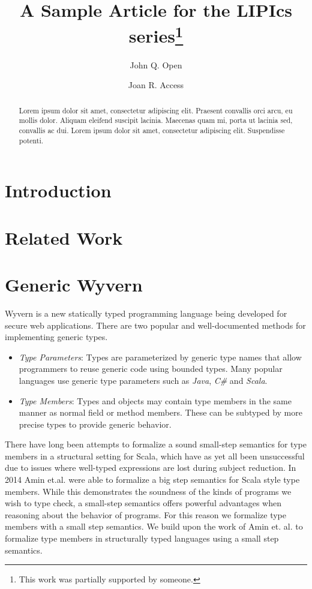 \documentclass[a4paper,UKenglish]{lipics}
\title{A Sample Article for the LIPIcs series\footnote{This work was partially supported by someone.}}
\author[1]{John Q. Open}
\author[2]{Joan R. Access}
\affil[1]{Dummy University Computing Laboratory\\
  Address, Country\\
  \texttt{open@dummyuni.org}}
\affil[2]{Department of Informatics, Dummy College\\
  Address, Country\\
  \texttt{access@dummycollege.org}}
\begin{document}
\maketitle

\begin{abstract}
Lorem ipsum dolor sit amet, consectetur adipiscing elit. Praesent convallis orci arcu, eu mollis dolor. Aliquam eleifend suscipit lacinia. Maecenas quam mi, porta ut lacinia sed, convallis ac dui. Lorem ipsum dolor sit amet, consectetur adipiscing elit. Suspendisse potenti. 
 \end{abstract}
 
\section{Introduction}

\section{Related Work}


\section{Generic Wyvern}
Wyvern is a new statically typed programming language being developed for secure web applications. There are two popular and well-documented methods \cite{Virtual Types stuff, generic java etc} for implementing generic types.
\begin{itemize}
\item \emph{Type Parameters}: Types are parameterized by generic type names that allow programmers to reuse generic code using bounded types. Many popular languages use generic type parameters such as \emph{Java}, \emph{C\#} and \emph{Scala}.
\item \emph{Type Members}: Types and objects may contain type members in the same manner as normal field or method members. These can be subtyped by more precise types to provide generic behavior.
\end{itemize}
There have long been attempts to formalize a sound small-step semantics for type members in a structural setting for Scala, which have as yet all been unsuccessful due to issues where well-typed expressions are lost during subject reduction. In 2014 Amin et.al. were able to formalize a big step semantics for Scala style type members. While this demonstrates the soundness of the kinds of programs we wish to type check, a small-step semantics offers powerful advantages when reasoning about the behavior of programs. For this reason we formalize type members with a small step semantics.
We build upon the work of Amin et. al. \cite{Scala stuff} to formalize type members in structurally typed languages using a small step semantics. 
 
\end{document}
